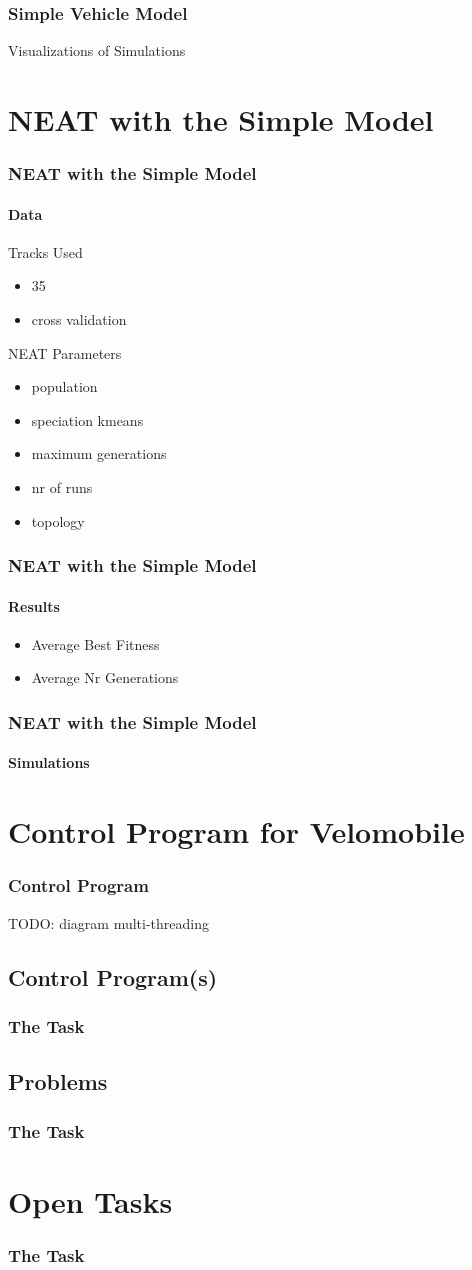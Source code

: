 \documentclass[8pt]{beamer}
\begin{document}
\begin{frame}
	\frametitle{Simple Vehicle Model}
	Visualizations of Simulations
\end{frame}

\section{NEAT with the Simple Model}
\begin{frame}
	\frametitle{NEAT with the Simple Model}
	\framesubtitle{Data}
	\begin{block}{Tracks Used}
		\begin{itemize}
			\item 35
			\item cross validation
		\end{itemize}
	\end{block}
	\begin{block}{NEAT Parameters}
		\begin{itemize}
		
		
			\item population
			\item speciation kmeans
			\item maximum generations
			\item nr of runs
			\item topology
		\end{itemize}
	\end{block}
\end{frame}

\begin{frame}
	\frametitle{NEAT with the Simple Model}
	\framesubtitle{Results}
	\begin{itemize}
		\item Average Best Fitness
		\item Average Nr Generations
	\end{itemize}
\end{frame}

\begin{frame}
	\frametitle{NEAT with the Simple Model}
	\framesubtitle{Simulations}
\end{frame}

\section{Control Program for Velomobile}
\begin{frame}
	\frametitle{Control Program}
	TODO: diagram multi-threading
\end{frame}

\subsection{Control Program(s)}
\begin{frame}
	\frametitle{The Task}
\end{frame}
\subsection{Problems}
\begin{frame}
	\frametitle{The Task}
\end{frame}

\section{Open Tasks}
\begin{frame}
	\frametitle{The Task}
\end{frame}
\end{document}
